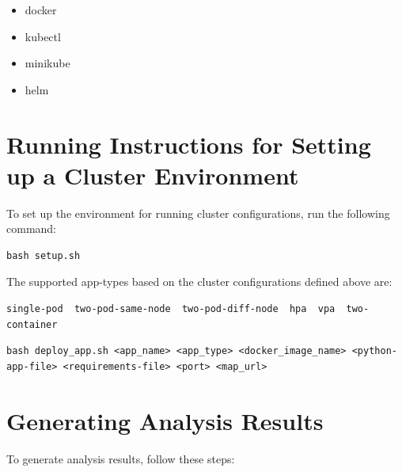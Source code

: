 \documentclass{article}
\begin{document}
\begin{itemize}
   \item docker
   \item kubectl
   \item minikube
   \item helm
\end{itemize}

\section{Running Instructions for Setting up a Cluster Environment}
To set up the environment for running cluster configurations, run the following command:

\begin{verbatim}
bash setup.sh
\end{verbatim}

The supported app-types based on the cluster configurations defined above are:

\begin{verbatim}
single-pod  two-pod-same-node  two-pod-diff-node  hpa  vpa  two-container
\end{verbatim}


\begin{verbatim}
bash deploy_app.sh <app_name> <app_type> <docker_image_name> <python-app-file> <requirements-file> <port> <map_url>
\end{verbatim}

\section{Generating Analysis Results}
To generate analysis results, follow these steps:
\end{document}

